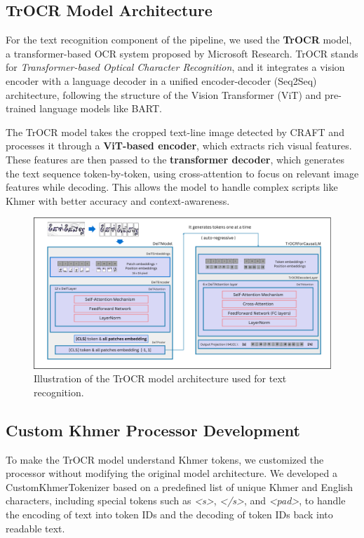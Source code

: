 \subsection{TrOCR Model Architecture}
\label{subsec:trocr-architecture}

For the text recognition component of the pipeline, we used the \textbf{TrOCR} model, a transformer-based OCR system proposed by Microsoft Research. TrOCR stands for \textit{Transformer-based Optical Character Recognition}, and it integrates a vision encoder with a language decoder in a unified encoder-decoder (Seq2Seq) architecture, following the structure of the Vision Transformer (ViT) and pre-trained language models like BART.

The TrOCR model takes the cropped text-line image detected by CRAFT and processes it through a \textbf{ViT-based encoder}, which extracts rich visual features. These features are then passed to the \textbf{transformer decoder}, which generates the text sequence token-by-token, using cross-attention to focus on relevant image features while decoding. This allows the model to handle complex scripts like Khmer with better accuracy and context-awareness.

\begin{figure}[H]
    \centering
    \includegraphics[width=\textwidth]{figures/trocr_model.png}
    \caption{Illustration of the TrOCR model architecture used for text recognition.}
    \label{fig:trocr-model}
\end{figure}

\subsection{Custom Khmer Processor Development}
\label{subsec:trocr-customization}

To make the TrOCR model understand Khmer tokens, we customized the processor without modifying the original model architecture. We developed a CustomKhmerTokenizer based on a predefined list of unique Khmer and English characters, including special tokens such as \textit{<s>}, \textit{</s>}, and \textit{<pad>}, to handle the encoding of text into token IDs and the decoding of token IDs back into readable text.

